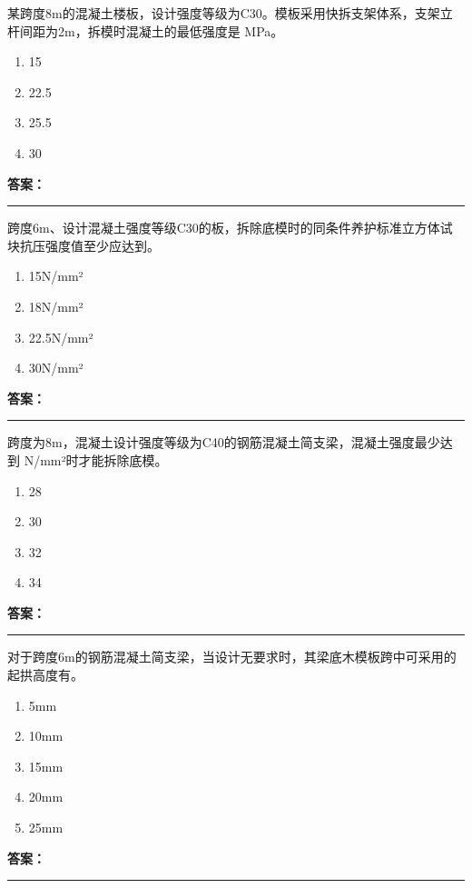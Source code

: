 \documentclass[UTF8,fontset=fandol,11pt]{ctexart}
\newcommand{\answerline}{\textcolor{answerred}{\rule{2.4cm}{0.7pt}}}
\begin{document}
\begin{quizbox}[title={第 37 题}]
某跨度8m的混凝土楼板，设计强度等级为C30。模板采用快拆支架体系，支架立杆间距为2m，拆模时混凝土的最低强度是 MPa。\\
\begin{enumerate}[label=\Alph*.]
\item 15
\item 22.5
\item 25.5
\item 30
\end{enumerate}
\textbf{\textcolor{answerred}{答案：}} \answerline
\end{quizbox}

\begin{quizbox}[title={第 38 题}]
跨度6m、设计混凝土强度等级C30的板，拆除底模时的同条件养护标准立方体试块抗压强度值至少应达到。\\
\begin{enumerate}[label=\Alph*.]
\item 15N/mm²
\item 18N/mm²
\item 22.5N/mm²
\item 30N/mm²
\end{enumerate}
\textbf{\textcolor{answerred}{答案：}} \answerline
\end{quizbox}

\begin{quizbox}[title={第 39 题}]
跨度为8m，混凝土设计强度等级为C40的钢筋混凝土简支梁，混凝土强度最少达到 N/mm²时才能拆除底模。\\
\begin{enumerate}[label=\Alph*.]
\item 28
\item 30
\item 32
\item 34
\end{enumerate}
\textbf{\textcolor{answerred}{答案：}} \answerline
\end{quizbox}

\begin{quizbox}[title={第 40 题}]
对于跨度6m的钢筋混凝土简支梁，当设计无要求时，其梁底木模板跨中可采用的起拱高度有。\\
\begin{enumerate}[label=\Alph*.]
\item 5mm
\item 10mm
\item 15mm
\item 20mm
\item 25mm
\end{enumerate}
\textbf{\textcolor{answerred}{答案：}} \answerline
\end{quizbox}
\end{document}
